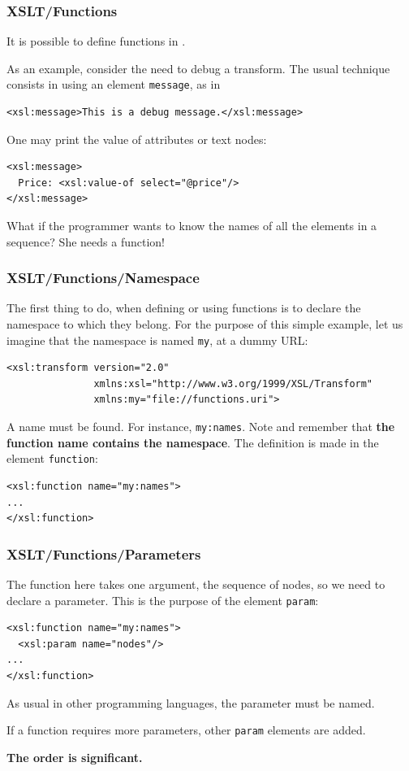 %
\begin{frame}[containsverbatim]
\frametitle{XSLT/Functions}

It is possible to define functions in \XSLT.

As an example, consider the need to debug a transform. The usual
technique consists in using an \XSLT element \texttt{message}, as in
{\small
\begin{verbatim}
<xsl:message>This is a debug message.</xsl:message>
\end{verbatim}
}
One may print the value of attributes or text nodes:
{\small
\begin{verbatim}
<xsl:message>
  Price: <xsl:value-of select="@price"/>
</xsl:message>
\end{verbatim}
}
What if the programmer wants to know the names of all the elements in
a sequence? She needs a function!

\end{frame}

%
\begin{frame}[containsverbatim]
\frametitle{XSLT/Functions/Namespace}

The first thing to do, when defining or using functions is to declare
the namespace to which they belong. For the purpose of this simple
example, let us imagine that the namespace is named \texttt{my}, at a
dummy URL:
{\small
\begin{verbatim}
<xsl:transform version="2.0"
               xmlns:xsl="http://www.w3.org/1999/XSL/Transform"
               xmlns:my="file://functions.uri">
\end{verbatim}
}
A name must be found. For instance, \texttt{my:names}. Note and
remember that \textbf{the function name contains the namespace}. The
definition is made in the \XSLT element \texttt{function}:
{\small
\begin{verbatim}
<xsl:function name="my:names">
...
</xsl:function>
\end{verbatim}
}

\end{frame}

%
\begin{frame}[containsverbatim]
\frametitle{XSLT/Functions/Parameters}

The function here takes one argument, the sequence of nodes, so we
need to declare a parameter. This is the purpose of the \XSLT element
\texttt{param}:
{\small
\begin{verbatim}
<xsl:function name="my:names">
  <xsl:param name="nodes"/>
...
</xsl:function>
\end{verbatim}
}
As usual in other programming languages, the parameter must be named.

If a function requires more parameters, other \texttt{param} elements
are added.

\textbf{The order is significant.}

\end{frame}


